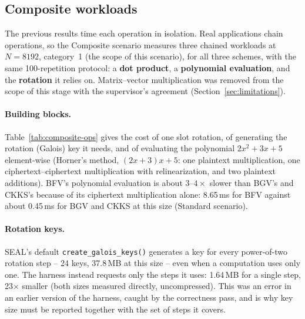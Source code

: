\subsection{Composite workloads}
\label{sec:composite}

The previous results time each operation in isolation. Real applications chain operations, so the Composite scenario measures three chained workloads at $N{=}8192$, category~1 (the scope of this scenario), for all three schemes, with the same 100-repetition protocol: a \textbf{dot product}, a \textbf{polynomial evaluation}, and the \textbf{rotation} it relies on. Matrix--vector multiplication was removed from the scope of this stage with the supervisor's agreement (Section~\ref{sec:limitations}).

\paragraph{Building blocks.} Table~\ref{tab:composite-ops} gives the cost of one slot rotation, of generating the rotation (Galois) key it needs, and of evaluating the polynomial $2x^2 + 3x + 5$ element-wise (Horner's method, $(2x+3)x+5$: one plaintext multiplication, one ciphertext--ciphertext multiplication with relinearization, and two plaintext additions). BFV's polynomial evaluation is about $3$--$4\times$ slower than BGV's and CKKS's because of its ciphertext multiplication alone: 8.65\,ms for BFV against about 0.45\,ms for BGV and CKKS at this size (Standard scenario).

\begin{table}[h!]
\centering\small

\caption{Composite building blocks, $N{=}8192$/category~1 (mean of 100 repetitions). The Galois key covers only the single rotation step actually used.}
\label{tab:composite-ops}
\end{table}

\paragraph{Rotation keys.} SEAL's default \texttt{create\_galois\_keys()} generates a key for every power-of-two rotation step -- 24 keys, 37.8\,MB at this size -- even when a computation uses only one. The harness instead requests only the steps it uses: 1.64\,MB for a single step, 23$\times$ smaller (both sizes measured directly, uncompressed). This was an error in an earlier version of the harness, caught by the correctness pass, and is why key size must be reported together with the set of steps it covers.

